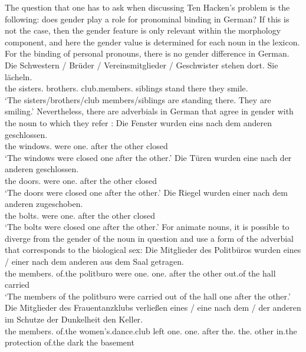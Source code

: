 The question that one has to ask when discussing Ten Hacken's problem is the following: does gender play a role for pronominal binding
in German? If this is not the case, then the gender feature is only relevant within the morphology
component, and here the gender value is determined for each noun in the lexicon. For the binding of personal pronouns, there is no gender difference in German. 
\ea
\gll Die Schwestern / Brüder / Vereinsmitglieder / Geschwister stehen dort. Sie lächeln.\\
     the sisters.\fem{} {} brothers.\mas{} {} club.members.\neu{} {} siblings stand there they smile.\\
\glt `The sisters/brothers/club members/siblings are standing there. They are smiling.'
\z
Nevertheless, there are adverbials in German that agree in gender with the noun to which they refer \citep[Chapter~6]{Hoehle83}:
\eal
\label{Beispiel-einer-nach-dem-anderen}
\ex
\gll Die Fenster wurden eins nach dem anderen geschlossen.\\
	 the windows.\neu{} were one.\neu{} after the other closed\\
\glt `The windows were closed one after the other.'
\ex 
\gll Die Türen wurden eine nach der anderen geschlossen.\\
	the doors.\fem{} were one.\fem{} after the other closed\\
\glt `The doors were closed one after the other.'
\ex 
\gll Die Riegel wurden einer nach dem anderen zugeschoben.\\
	 the bolts.\mas{} were one.\mas{} after the other closed\\
	 \glt `The bolts were closed one after the other.'
\zl
For animate nouns, it is possible to diverge from the gender of the noun in question and use a form of
the adverbial that corresponds to the biological sex:
\eal
\ex 
\gll Die Mitglieder des Politbüros wurden eines / einer nach dem anderen aus dem Saal getragen.\\
	 the members.\neu{} of.the politburo were one.\neu{} {} one.\mas{} after the other out.of the hall carried\\
\glt `The members of the politburo were carried out of the hall one after the other.'
\ex 
\gll Die Mitglieder des Frauentanzklubs verließen eines / eine nach dem / der anderen im Schutze der Dunkelheit den
Keller.\\
the members.\neu{} of.the women's.dance.club left one.\neu{} {} one.\fem{} after the.\neu{} {} the.\fem{} other in.the protection of.the dark the
basement\\

